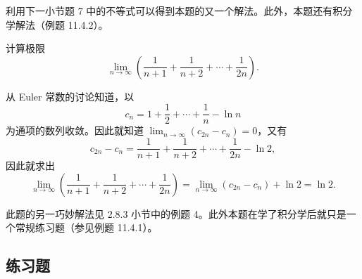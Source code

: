 \begin{xremark}
利用下一小节题 7 中的不等式可以得到本题的又一个解法。此外，本题还有积分学解法（例题 11.4.2）。
\end{xremark}

\begin{xexample}[2.5.4]
计算极限
\[
  \lim_{n\to\infty}\left(\frac1{n+1}+\frac1{n+2}+\cdots+\frac1{2n}\right).
\]
\end{xexample}
\begin{xsolution}
从 Euler 常数的讨论知道，以
\[
  c_n=1+\frac12+\cdots+\frac1n-\ln n
\]
为通项的数列收敛。因此就知道 $\displaystyle\lim_{n\to\infty}(c_{2n}-c_n)=0$，又有
\[
  c_{2n}-c_n=\frac1{n+1}+\frac1{n+2}+\cdots+\frac1{2n}-\ln2,
\]
因此就求出
\[
  \lim_{n\to\infty}\left(\frac1{n+1}+\frac1{n+2}+\cdots+\frac1{2n}\right)
  =\lim_{n\to\infty}(c_{2n}-c_n)+\ln2=\ln2.
\]
\end{xsolution}

\begin{xremark}
此题的另一巧妙解法见 2.8.3 小节中的例题 4。此外本题在学了积分学后就只是一个常规练习题（参见例题 11.4.1）。
\end{xremark}

\subsection{练习题}

